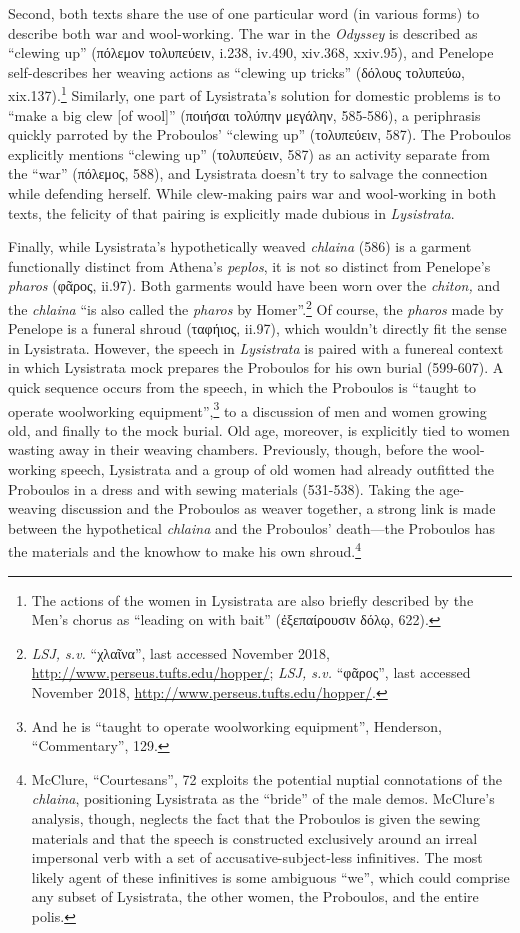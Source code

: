 \documentclass[12pt]{article}
\begin{document}
Second, both texts share the use of one particular word (in various forms) to describe both war and wool-working. The war in the \textit{Odyssey} is described as ``clewing up'' (πόλεμον τολυπεύειν, i.238, iv.490, xiv.368, xxiv.95), and Penelope self-describes her weaving actions as ``clewing up tricks'' (δόλους τολυπεύω, xix.137).\footnote{The actions of the women in Lysistrata are also briefly described by the Men's chorus as ``leading on with bait'' (ἐξεπαίρουσιν δόλῳ, 622).} Similarly, one part of Lysistrata's solution for domestic problems is to ``make a big clew [of wool]'' (ποιήσαι τολύπην μεγάλην, 585-586), a periphrasis quickly parroted by the Proboulos' ``clewing up'' (τολυπεύειν, 587). The Proboulos explicitly mentions ``clewing up'' (τολυπεύειν, 587) as an activity separate from the ``war'' (πόλεμος, 588), and Lysistrata doesn't try to salvage the connection while defending herself. While clew-making pairs war and wool-working in both texts, the felicity of that pairing is explicitly made dubious in \textit{Lysistrata}.

Finally, while Lysistrata's hypothetically weaved \textit{chlaina} (586) is a garment functionally distinct from Athena's \textit{peplos}, it is not so distinct from Penelope's \textit{pharos} (φᾶρος, ii.97). Both garments would have been worn over the \textit{chiton,} and the \textit{chlaina} ``is also called the \textit{pharos} by Homer''.\footnote{\textit{LSJ, s.v.} ``χλαῖνα'', last accessed November 2018, \url{http://www.perseus.tufts.edu/hopper/}; \textit{LSJ, s.v.} ``φᾶρος'', last accessed November 2018, \url{http://www.perseus.tufts.edu/hopper/}.} Of course, the \textit{pharos} made by Penelope is a funeral shroud (ταφήιος, ii.97), which wouldn't directly fit the sense in Lysistrata. However, the speech in \textit{Lysistrata} is paired with a funereal context in which Lysistrata mock prepares the Proboulos for his own burial (599-607). A quick sequence occurs from the speech, in which the Proboulos is ``taught to operate woolworking equipment'',\footnote{And he is ``taught to operate woolworking equipment'', Henderson, ``Commentary'', 129.} to a discussion of men and women growing old, and finally to the mock burial. Old age, moreover, is explicitly tied to women wasting away in their weaving chambers. Previously, though, before the wool-working speech, Lysistrata and a group of old women had already outfitted the Proboulos in a dress and with sewing materials (531-538). Taking the age-weaving discussion and the Proboulos as weaver together, a strong link is made between the hypothetical \textit{chlaina} and the Proboulos' death---the Proboulos has the materials and the knowhow to make his own shroud.\footnote{McClure, ``Courtesans'', 72 exploits the potential nuptial connotations of the \textit{chlaina}, positioning Lysistrata as the ``bride'' of the male demos. McClure's analysis, though, neglects the fact that the Proboulos is given the sewing materials and that the speech is constructed exclusively around an irreal impersonal verb with a set of accusative-subject-less infinitives. The most likely agent of these infinitives is some ambiguous ``we'', which could comprise any subset of Lysistrata, the other women, the Proboulos, and the entire polis.}
\end{document}
